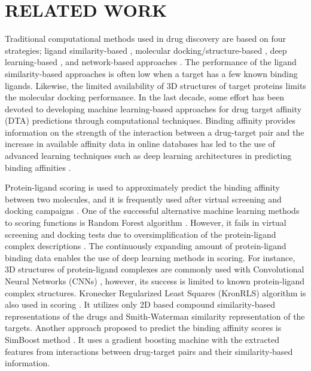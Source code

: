 \chapter{RELATED WORK}
\label{related_work}

Traditional computational methods used in drug discovery are based on four strategies; ligand similarity-based \cite{keiser2007relating}, molecular docking/structure-based \cite{morris2009autodock4,donald2011algorithms}, deep learning-based \cite{wan2018neodti, luo2017network}, and network-based approaches \cite{luo2017network, zheng2013collaborative, chen2012drug, wang2014drug}. The performance of the ligand similarity-based approaches is often low when a target has a few known binding ligands. Likewise, the limited availability of 3D structures of target proteins limits the molecular docking performance. In the last decade, some effort has been devoted to developing machine learning-based approaches for drug target affinity (DTA) predictions through computational techniques. Binding affinity provides information on the strength of the interaction between a drug-target pair and the increase in available affinity data in online databases has led to the use of advanced learning techniques such as deep learning architectures in predicting binding affinities \cite{chan2016large, tian2016boosting, hamanaka2017cgbvs}.

Protein-ligand scoring is used to approximately predict the binding affinity between two molecules, and it is frequently used after virtual screening and docking campaigns \cite{ragoza2017protein}. One of the successful alternative machine learning methods to scoring functions is Random Forest algorithm \cite{ballester2010machine, shar2016pred}. However, it fails in virtual screening and docking tests due to oversimplification of the protein-ligand complex descriptions \cite{gabel2014beware}. The continuously expanding amount of protein-ligand binding data enables the use of deep learning methods in scoring. For instance, 3D structures of protein-ligand complexes are commonly used with Convolutional Neural Networks (CNNs) \cite{gomes2017atomic, ragoza2017protein, wallach2015atomnet}, however, its success is limited to known protein-ligand complex structures. Kronecker Regularized Least Squares (KronRLS) algorithm is also used in scoring \cite{pahikkala2014toward}. It utilizes only 2D based compound similarity-based representations of the drugs and Smith-Waterman similarity representation of the targets. Another approach proposed to predict the binding affinity scores is SimBoost method \cite{he2017simboost}. It uses a gradient boosting machine with the extracted features from interactions between drug-target pairs and their similarity-based information. 

